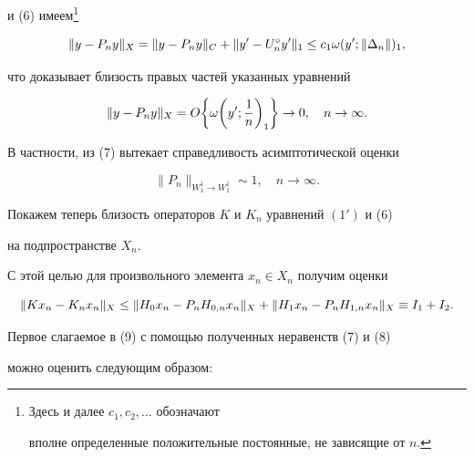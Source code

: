 и (6) имеем\footnote{Здесь и далее $c_1,c_2,\dotsc$ обозначают


вполне определенные положительные постоянные, не зависящие от $n$.}


$$


\|y-P_ny\|_\X =\|y-P_ny\|_C +\|y'-U_n^\circ y'\|_1\leq


c_1\omega(y';\|\Delta_n\|)_1,


$$


что доказывает близость правых частей указанных уравнений


\begin{equation}


\|y-P_ny\|_\X =O\bigg\{\omega\bigg(y';\frac{1}{n}


\bigg)_1 \bigg\}\to 0, \quad n\to \infty.


\end{equation}


В частности, из (7) вытекает справедливость асимптотической оценки


\begin{equation}


\|P_n\|_{W_1^1\to W_1^1}\sim 1,\quad n\to \infty .


\end{equation}





Покажем теперь близость операторов $K$ и $K_n$ уравнений $(1')$ и (6)


на подпространстве $X_n$.


С этой целью для произвольного элемента $x_n\in X_n$ получим оценки


\begin{equation}


\|Kx_n-K_nx_n\|_\X \leq \|H_0x_n-P_nH_{0,n}x_n\|_\X +


\|H_1x_n-P_nH_{1,n}x_n\|_\X\equiv I_1+I_2.


\end{equation}





Первое слагаемое в (9) с помощью полученных неравенств (7) и (8)


можно оценить следующим образом:


